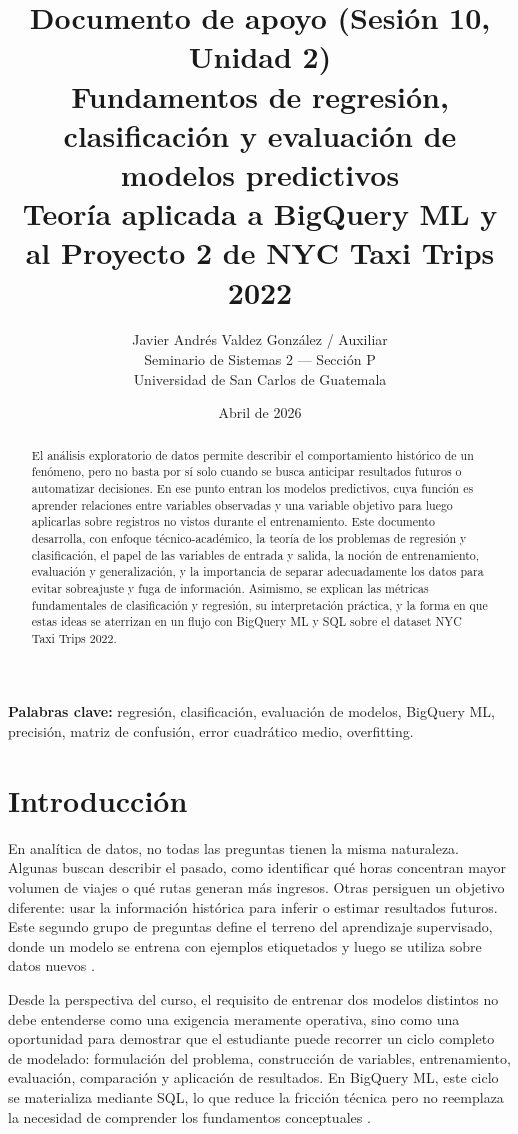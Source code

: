 \documentclass[12pt]{article}
\title{\textbf{Documento de apoyo (Sesión 10, Unidad 2)}\\
\large Fundamentos de regresión, clasificación y evaluación de modelos predictivos\\
\normalsize Teoría aplicada a BigQuery ML y al Proyecto 2 de NYC Taxi Trips 2022}
\author{Javier Andrés Valdez González / Auxiliar \\
\small Seminario de Sistemas 2 --- Sección P \\
\small Universidad de San Carlos de Guatemala}
\date{Abril de 2026}
\begin{document}
\maketitle

\begin{abstract}
El análisis exploratorio de datos permite describir el comportamiento histórico de un fenómeno, pero no basta por sí solo cuando se busca anticipar resultados futuros o automatizar decisiones. En ese punto entran los modelos predictivos, cuya función es aprender relaciones entre variables observadas y una variable objetivo para luego aplicarlas sobre registros no vistos durante el entrenamiento. Este documento desarrolla, con enfoque técnico-académico, la teoría de los problemas de regresión y clasificación, el papel de las variables de entrada y salida, la noción de entrenamiento, evaluación y generalización, y la importancia de separar adecuadamente los datos para evitar sobreajuste y fuga de información. Asimismo, se explican las métricas fundamentales de clasificación y regresión, su interpretación práctica, y la forma en que estas ideas se aterrizan en un flujo con BigQuery ML y SQL sobre el dataset NYC Taxi Trips 2022.
\end{abstract}

\textbf{Palabras clave:} regresión, clasificación, evaluación de modelos, BigQuery ML, precisión, matriz de confusión, error cuadrático medio, overfitting.

\newpage
\tableofcontents

\section{Introducción}
En analítica de datos, no todas las preguntas tienen la misma naturaleza. Algunas buscan describir el pasado, como identificar qué horas concentran mayor volumen de viajes o qué rutas generan más ingresos. Otras persiguen un objetivo diferente: usar la información histórica para inferir o estimar resultados futuros. Este segundo grupo de preguntas define el terreno del aprendizaje supervisado, donde un modelo se entrena con ejemplos etiquetados y luego se utiliza sobre datos nuevos \cite{gcp_bqml_eval_overview,google_overfitting}.

Desde la perspectiva del curso, el requisito de entrenar dos modelos distintos no debe entenderse como una exigencia meramente operativa, sino como una oportunidad para demostrar que el estudiante puede recorrer un ciclo completo de modelado: formulación del problema, construcción de variables, entrenamiento, evaluación, comparación y aplicación de resultados. En BigQuery ML, este ciclo se materializa mediante SQL, lo que reduce la fricción técnica pero no reemplaza la necesidad de comprender los fundamentos conceptuales \cite{gcp_create_glm,gcp_predict}.
\end{document}
